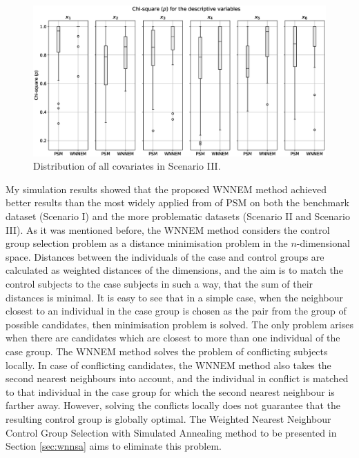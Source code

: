 								
		\begin{figure}[h]
			\centering
                \captionsetup{justification=centering}
			\includegraphics[width=\textwidth]{assets/figures/control_group_selection/wnnem/scenIII/distribution.eps}
			\caption{Distribution of all covariates in Scenario III. %
   }
			\label{fig:wnnem_scen_III_distribution}    
		\end{figure}

        \vspace{0.5cm}
        
		My simulation results showed that the proposed WNNEM method achieved better results than the most widely applied from of PSM on both the benchmark dataset (Scenario I) and the more problematic datasets (Scenario II and Scenario III). As it was mentioned before, the WNNEM method considers the control group selection problem as a distance minimisation problem in the $n$-dimensional space. Distances between the individuals of the case and control groups are calculated as weighted distances of the dimensions, and the aim is to match the control subjects to the case subjects in such a way, that the sum of their distances is minimal. It is easy to see that in a simple case, when the neighbour closest to an individual in the case group is chosen as the pair from the group of possible candidates, then minimisation problem is solved. The only problem arises when there are candidates which are closest to more than one individual of the case group. The WNNEM method solves the problem of conflicting subjects locally. In case of conflicting candidates, the WNNEM method also takes the second nearest neighbours into account, and the individual in conflict is matched to that individual in the case group for which the second nearest neighbour is farther away. However, solving the conflicts locally does not guarantee that the resulting control group is globally optimal. The Weighted Nearest Neighbour Control Group Selection with Simulated Annealing method to be presented in Section \ref{sec:wnnsa} aims to eliminate this problem. 
								
